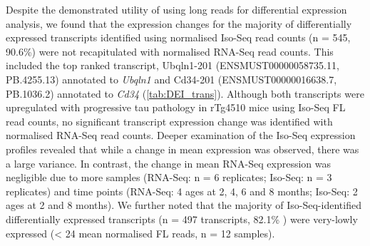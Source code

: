 Despite the demonstrated utility of using long reads for differential expression analysis, we found that the expression changes for the majority of differentially expressed transcripts identified using normalised Iso-Seq read counts (n = 545, 90.6\%) were not recapitulated with normalised RNA-Seq read counts. This included the top ranked transcript, Ubqln1-201 (ENSMUST00000058735.11, PB.4255.13) annotated to \textit{Ubqln1} and Cd34-201 (ENSMUST00000016638.7, PB.1036.2) annotated to \textit{Cd34} (\cref{tab:DEI_trans}). Although both transcripts were upregulated with progressive tau pathology in rTg4510 mice using Iso-Seq FL read counts, no significant transcript expression change was identified with normalised RNA-Seq read counts. Deeper examination of the Iso-Seq expression profiles revealed that while a change in mean expression was observed, there was a large variance. In contrast, the change in mean RNA-Seq expression was negligible due to more samples (RNA-Seq: n = 6 replicates; Iso-Seq: n = 3 replicates) and time points (RNA-Seq: 4 ages at 2, 4, 6 and 8 months; Iso-Seq: 2 ages at 2 and 8 months). We further noted that the majority of Iso-Seq-identified differentially expressed transcripts (n = 497 transcripts, 82.1\% ) were very-lowly expressed (< 24 mean normalised FL reads, n = 12 samples). 

